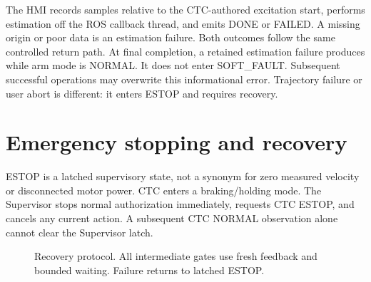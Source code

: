 \documentclass[11pt,a4paper]{report}
\newcommand{\id}[1]{\texttt{\small\detokenize{#1}}}
\begin{document}
The HMI records samples relative to the CTC-authored excitation start, performs estimation off the ROS callback thread, and emits DONE or FAILED. A missing origin or poor data is an estimation failure. Both outcomes follow the same controlled return path. At final completion, a retained estimation failure produces \id{ERROR_SYSID_ESTIMATION=-14} while arm mode is NORMAL. It does not enter SOFT\_FAULT. Subsequent successful operations may overwrite this informational error. Trajectory failure or user abort is different: it enters ESTOP and requires recovery.

\section{Emergency stopping and recovery}
ESTOP is a latched supervisory state, not a synonym for zero measured velocity or disconnected motor power. CTC enters a braking/holding mode. The Supervisor stops normal authorization immediately, requests CTC ESTOP, and cancels any current action. A subsequent CTC NORMAL observation alone cannot clear the Supervisor latch.

\begin{figure}[htbp]
\centering
{}
\caption{Recovery protocol. All intermediate gates use fresh feedback and bounded waiting. Failure returns to latched ESTOP.}
\end{figure}
\end{document}

